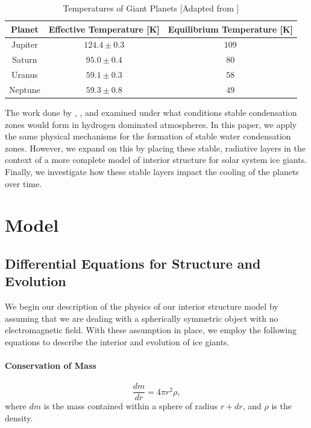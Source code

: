 \documentclass[11pt]{ucscthesisbs}
\begin{document}
\begin{table}[]
\centering
\begin{tabular}{ccc}
Planet                        & Effective Temperature [K]            & Equilibrium Temperature [K] \\ \hline
\multicolumn{1}{|c|}{Jupiter} & \multicolumn{1}{c|}{$124.4 \pm 0.3$} & \multicolumn{1}{c|}{$109$}  \\ \hline
\multicolumn{1}{|c|}{Saturn}  & \multicolumn{1}{c|}{$95.0 \pm 0.4$}  & \multicolumn{1}{c|}{$80$}   \\ \hline
\multicolumn{1}{|c|}{Uranus}  & \multicolumn{1}{c|}{$59.1 \pm 0.3$}  & \multicolumn{1}{c|}{$58$}   \\ \hline
\multicolumn{1}{|c|}{Neptune} & \multicolumn{1}{c|}{$59.3 \pm 0.8$}  & \multicolumn{1}{c|}{$49$}   \\ \hline
\end{tabular}
\caption{Temperatures of Giant Planets [Adapted from \citep{seager_2010}]}
\label{tab:planetary_temperatures}
\end{table}


The work done by \citep{guillot_1995}, \citep{friedson_2017}, and \citep{leconte_2017} examined under what conditions stable condensation zones would form in hydrogen dominated atmospheres. In this paper, we apply the same physical mechanisms for the formation of stable water condensation zones. However, we expand on this by placing these stable, radiative layers in the context of a more complete model of interior structure for solar system ice giants. Finally, we investigate how these stable layers impact the cooling of the planets over time. 


\chapter{Model}

\section{Differential Equations for Structure and Evolution}
\label{Three-layer Model with Dry Adiabat}
We begin our description of the physics of our interior structure model by assuming that we are dealing with a spherically symmetric object with no electromagnetic field.  With these assumption in place, we employ the following equations to describe the interior and evolution of ice giants.
\subsubsection{Conservation of Mass}
\begin{equation}
  \frac{dm}{dr} =4 \pi r^{2}\rho  ,
\end{equation}
where $dm$ is the mass contained within a sphere of radius $r + dr$, and $\rho$ is the density. 
\end{document}
